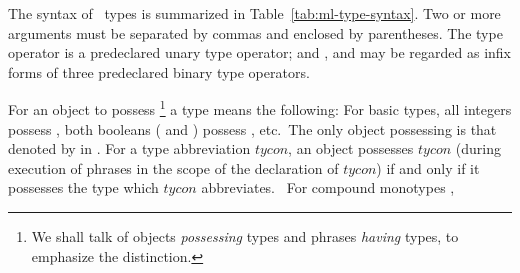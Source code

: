 \documentclass[11pt]{article}
\begin{document}
The syntax of \ML\ types is summarized in Table~\ref{tab:ml-type-syntax}.
%
%
Two or more arguments must be separated by
commas and enclosed by parentheses.  The type operator 
is a predeclared unary type operator; and \ttQ{*}, \ttQ{+} and \ttQ{->} may be
regarded as infix forms of three predeclared binary type operators.

For an object to possess%
\footnote{We shall talk of objects {\it possessing\/} types and phrases {\it
	  having\/} types, to emphasize the distinction.}
a type means the following: For basic types, all integers possess ,
both booleans ( and ) possess 
,
etc.\ The only object possessing
 is that denoted by \ttQ{()} in
\ML.  For a type abbreviation $tycon$, an object possesses $tycon$ (during
execution of phrases in the scope of the declaration of $tycon$) if and only if
it possesses the type which $tycon$ abbreviates.
\
For compound monotypes
,
\end{document}
